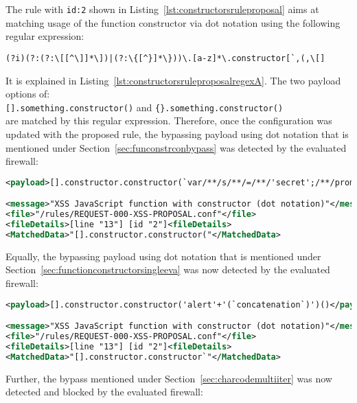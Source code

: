 The rule with \verb|id:2| shown in Listing~\ref{lst:constructorsruleproposal} aims at matching usage of the function constructor via dot notation using the following regular expression:

\begin{lstlisting}[style=basicStyle]
(?i)(?:(?:\[[^\]]*\])|(?:\{[^}]*\}))\.[a-z]*\.constructor[`,(,\[]
\end{lstlisting}

It is explained in Listing~\ref{lst:constructorsruleproposalregexA}.
The two payload options of: \\
\verb|[].something.constructor()| and \verb|{}.something.constructor()| \\
are matched by this regular expression. Therefore, once the configuration was updated with the proposed rule, the bypassing payload using dot notation that is mentioned under Section~\ref{sec:funconstrconbypass} was detected by the evaluated firewall:

\begin{lstlisting}[style=ruleStyle, language=XML, label={lst:constructorsblockedpoc}, caption=Function() constructor + string concatenation bypass in dot notation blocked]
<payload>[].constructor.constructor(`var/**/s/**/=/**/'secret';/**/promp`/**/+/**/`t(s,/**/s)`)()</payload>

<message>"XSS JavaScript function with constructor (dot notation)"</message>
<file>"/rules/REQUEST-000-XSS-PROPOSAL.conf"</file>
<fileDetails>[line "13"] [id "2"]<fileDetails>
<MatchedData>"[].constructor.constructor("</MatchedData>
\end{lstlisting}

Equally, the bypassing payload using dot notation that is mentioned under Section~\ref{sec:functionconstructorsingleeva} was now detected by the evaluated firewall:

\begin{lstlisting}[style=ruleStyle, language=XML, caption=Function() constructor bypass blocked]
<payload>[].constructor.constructor('alert'+'(`concatenation`)')()</payload>

<message>"XSS JavaScript function with constructor (dot notation)"</message>
<file>"/rules/REQUEST-000-XSS-PROPOSAL.conf"</file>
<fileDetails>[line "13"] [id "2"]<fileDetails>
<MatchedData>"[].constructor.constructor`"</MatchedData>
\end{lstlisting}

Further, the bypass mentioned under Section~\ref{sec:charcodemultiiter} was now detected and blocked by the evaluated firewall:

